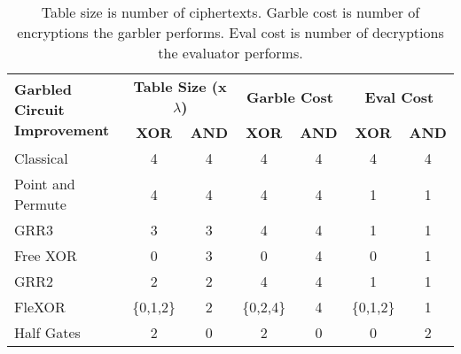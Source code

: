 \begin{table}[t]
    \centering
    \renewcommand{\arraystretch}{1.2}
    \normalsize
    \begin{adjustbox}{width=1\textwidth}
        \begin{tabular}{|p{5cm}|c|c|c|c|c|c|}
            \hline
            \multirow{2}{5cm}{\centering \textbf{Garbled Circuit Improvement}} & 
            \multicolumn{2}{c|}{\textbf{Table Size (x$\lambda$)}} & 
            \multicolumn{2}{c|}{\textbf{Garble Cost}} & 
            \multicolumn{2}{c|}{\textbf{Eval Cost}} \\
            \cline{2-7}
            & \textbf{XOR} & \textbf{AND} & \textbf{XOR} & \textbf{AND}  & \textbf{XOR} & \textbf{AND} \\
            \hline
            Classical & 4 & 4 & 4 & 4 & 4 & 4 \\ \hline
            Point and Permute & 4 & 4 & 4 & 4 & 1 & 1 \\ \hline
            GRR3 & 3 & 3 & 4 & 4  & 1 & 1 \\ \hline
            Free XOR & 0 & 3 & 0 & 4 & 0 & 1  \\ \hline
            GRR2  & 2 & 2 & 4 & 4 & 1 & 1  \\ \hline
            FleXOR & \{0,1,2\} & 2 & \{0,2,4\} & 4 & \{0,1,2\} & 1  \\ \hline
            Half Gates & 2 & 0 & 2 & 0 & 0 & 2  \\ \hline
        \end{tabular}
    \end{adjustbox}
    \caption{Table size is number of ciphertexts. Garble cost is number of encryptions the garbler performs. Eval cost is number of decryptions the evaluator performs.}
\end{table}


